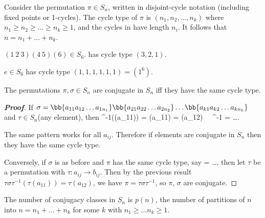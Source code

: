 \begin{definition}
Consider the permutation $\pi \in S_n$, written in disjoint-cycle notation (including fixed points or 1-cycles). The cycle type of $\pi$ is $(n_1,n_2,\dots,n_k)$ where $n_1\geq n_2\geq \dots \geq n_k \geq 1$, and the cycles in have length $n_i$. It follows that $n=n_1+\dots + n_k$.
\end{definition}

\begin{example}
$(1\ 2\ 3)(4\ 5)(6)\in S_6$. has cycle type $(3,2,1)$.

$e\in S_6$ has cycle type $(1,1,1,1,1,1) = (1^6)$.
\end{example}



\begin{theorem}\label{thm:permutation_cycle_type}
The permutations $\pi,\sigma \in S_n$ are conjugate in $S_n$ iff they have the same cycle type.
\end{theorem}

\begin{proof}[\bf Proof]
If $\sigma = \bb{a_{11}a_{12}\dots a_{1n_1}}\bb{a_{21}a_{22}\dots a_{2n_2}}\dots \bb{a_{k1}a_{k2}\dots a_{kn_k}}$ and $\tau \in S_n$(any element), then
\be
\tau \sigma \tau^{-1}(\tau(a_{11})) = \tau \sigma(a_{11}) = \tau(a_{12}) \ \ra \ \tau \sigma \tau^{-1} =  \dots {}.
\ee

The same pattern works for all $a_{ij}$. Therefore if elements are conjugate in $S_n$ then they have the same cycle type.

Conversely, if $\sigma$ is as before and $\pi$ has the same cycle type, say
\be
\pi = \dots {},
\ee
then let $\tau$ be a permutation with $\tau :a_{ij} \to b_{ij}$. Then by the previous result $\tau \sigma \tau^{-1}(\tau(a_{11})) = \tau(a_{12}) $, we have $\pi = \tau \sigma \tau^{-1}$, so $\pi$, $\sigma$ are conjugate.
\end{proof}

\begin{corollary}
The number of conjugacy classes in $S_n$ is $p(n)$, the number of partitions of $n$ into $n=n_1+\dots + n_k $ for some $k$ with $n_1\geq \dots n_k \geq 1$.
\end{corollary}

